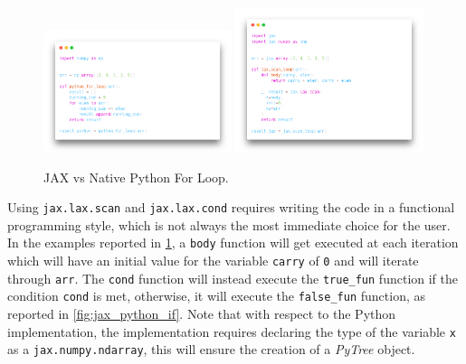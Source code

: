 \begin{figure}
    \centering
    \caption{JAX vs Native Python For Loop.}
    \label{fig:jax_python_forloop}
    \includegraphics[width=0.49\textwidth]{Images/python_forloop.png}
    \includegraphics[width=0.49\textwidth]{Images/jax_forloop.png}
\end{figure}

Using \texttt{jax.lax.scan} and \texttt{jax.lax.cond} requires writing the code in a functional programming style, which is not always the most immediate choice for the user. In the examples reported in \cref{fig:jax_python_forloop}, a \texttt{body} function will get executed at each iteration which will have an initial value for the variable \texttt{carry} of \texttt{0} and will iterate through \texttt{arr}. The \texttt{cond} function will instead execute the \texttt{true\_fun} function if the condition \texttt{cond} is met, otherwise, it will execute the \texttt{false\_fun} function, as reported in \cref{fig:jax_python_if}. Note that with respect to the Python implementation, the \jax implementation requires declaring the type of the variable \texttt{x} as a \texttt{jax.numpy.ndarray}, this will ensure the creation of a \textit{PyTree} object.

